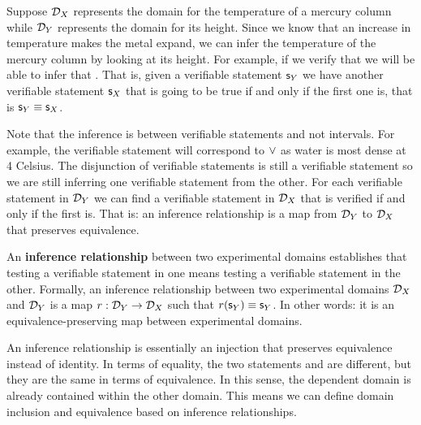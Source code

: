 Suppose $\mathcal{D}_X$ represents the domain for the temperature of a mercury column while $\mathcal{D}_Y$ represents the domain for its height. Since we know that an increase in temperature makes the metal expand, we can infer the temperature of the mercury column by looking at its height. For example, if we verify that  we will be able to infer that . That is, given a verifiable statement $\mathsf{s}_Y$ we have another verifiable statement $\mathsf{s}_X$ that is going to be true if and only if the first one is, that is $\mathsf{s}_Y\equiv\mathsf{s}_X$.

Note that the inference is between verifiable statements and not intervals. For example, the verifiable statement  will correspond to $\vee$ as water is most dense at 4 Celsius. The disjunction of verifiable statements is still a verifiable statement so we are still inferring one verifiable statement from the other. For each verifiable statement in $\mathcal{D}_Y$ we can find a verifiable statement in $\mathcal{D}_X$ that is verified if and only if the first is. That is: an inference relationship is a map from $\mathcal{D}_Y$ to $\mathcal{D}_X$ that preserves equivalence.

\begin{mathSection}
	\begin{defn}
		An \textbf{inference relationship} between two experimental domains establishes that testing a verifiable statement in one means testing a verifiable statement in the other. Formally, an inference relationship between two experimental domains $\mathcal{D}_X$ and $\mathcal{D}_Y$ is a map $r: \mathcal{D}_Y \to \mathcal{D}_X$ such that $r(\mathsf{s}_Y) \equiv \mathsf{s}_Y$. In other words: it is an equivalence-preserving map between experimental domains.
	\end{defn}
\end{mathSection}

An inference relationship is essentially an injection that preserves equivalence instead of identity. In terms of equality, the two statements  and  are different, but they are the same in terms of equivalence. In this sense, the dependent domain is already contained within the other domain. This means we can define domain inclusion and equivalence based on inference relationships.

